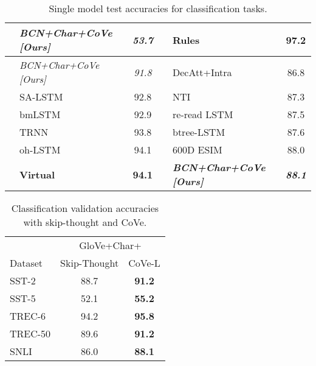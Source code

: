 \begin{table}
\begin{tabular}{llcllc}
                        & {\it \textbf{BCN+Char+CoVe [Ours]} }           & {\it \textbf{53.7}} &                         &  \textbf{Rules~\citep{Madabushi2016HighAR}}                   & \textbf{97.2}             \\
\midrule
 \parbox[t]{2mm}{}  & {\it BCN+Char+CoVe [Ours]}                     &{\it91.8}          & \parbox[t]{2mm}{}   &DecAtt+Intra~\citep{Parikh2016ADA} &86.8             \\
                        & SA-LSTM~\citep{Dai2015SemisupervisedSL} &92.8             &                         & NTI~\citep{Munkhdalai2016NeuralTI} & 87.3             \\
                        & bmLSTM~\citep{Radford2017LearningTG} &92.9             &                        & re-read LSTM~\citep{Sha2016ReadingAT} & 87.5             \\
                        & TRNN~\citep{Dieng2016TopicRNNAR} &93.8             &                        & btree-LSTM~\citep{Paria2016ANA} & 87.6            \\
               & oh-LSTM~\citep{Johnson2016SupervisedAS} &94.1             &                         & 600D ESIM~\citep{Chen2016EnhancingAC} &  88.0             \\
                        & {\bf Virtual~\citep{Miyato2017AdversarialTM}} &{\bf94.1}            &                         & {\it \textbf{BCN+Char+CoVe [Ours]}}            & {\it\textbf{88.1}} \\
\bottomrule
  \end{tabular}
      \caption{Single model test accuracies for classification tasks.}
  \label{testPerf}
  \vspace{-4mm}
\end{table}

\begin{wraptable}{r}{6cm}
  \vspace{-3.5mm}
\captionsetup{width=5.6cm}
  \centering
\begin{tabular}{lcc}
\toprule
        & \multicolumn{2}{c}{GloVe+Char+} \\
\cmidrule(lr){2-3}
Dataset & Skip-Thought & CoVe-L \\
\midrule
SST-2   & 88.7 & \textbf{91.2}\\ 
SST-5   & 52.1 & \textbf{55.2}\\
TREC-6  & 94.2 & \textbf{95.8}\\ 
TREC-50 & 89.6 & \textbf{91.2}\\
SNLI    & 86.0 &  \textbf{88.1}\\
\bottomrule
  \end{tabular}
      \caption{Classification validation accuracies with skip-thought and CoVe.}
  \label{SkipTable}
\end{wraptable}

